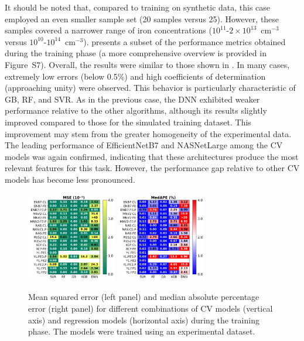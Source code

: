 \documentclass[10pt]{iopart}
\begin{document}
It should be noted that, compared to training on synthetic data, this case employed an even smaller sample set (20 samples versus 25).
However, these samples covered a narrower range of iron concentrations ($10^{11}$-$2\times10^{13}$~cm$^{-3}$ versus $10^{10}$-$10^{14}$~cm$^{-3}$).
 presents a subset of the performance metrics obtained during the training phase
(a more comprehensive overview is provided in Figure~S7).
Overall, the results were similar to those shown in .
In many cases, extremely low errors (below 0.5\%) and high coefficients of determination (approaching unity) were observed.
This behavior is particularly characteristic of GB, RF, and SVR.
As in the previous case, the DNN exhibited weaker performance relative to the other algorithms,
although its results slightly improved compared to those for the simulated training dataset.
This improvement may stem from the greater homogeneity of the experimental data.
The leading performance of EfficientNetB7 and NASNetLarge among the CV models was again confirmed,
indicating that these architectures produce the most relevant features for this task.
However, the performance gap relative to other CV models has become less pronounced.

\begin{figure}
\centering
\includegraphics[width=0.35\textwidth]{Fig9a}
\includegraphics[width=0.35\textwidth]{Fig9b}
\caption{
Mean squared error (left panel) and median absolute percentage error (right panel) for different combinations of CV models (vertical axis)
and regression models (horizontal axis) during the training phase.
The models were trained using an experimental dataset.
}\label{Fig9}
\end{figure}
\end{document}
